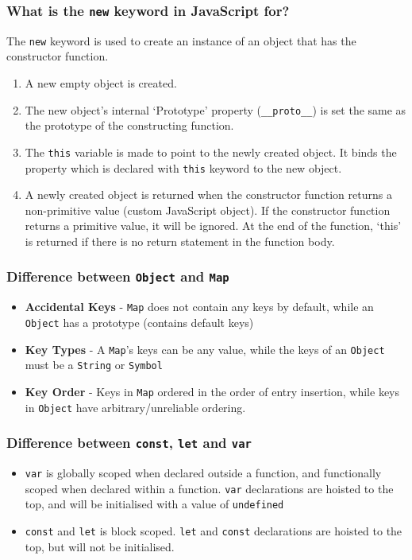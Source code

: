 \documentclass[12pt, a4paper]{article}
\newcommand{\code}[1]{\texttt{#1}}
\begin{document}
\subsubsection*{What is the \code{new} keyword in JavaScript for?}
The \code{new} keyword is used to create an instance of an object that has the constructor function.
\begin{enumerate}
    \item A new empty object is created.
    \item The new object’s internal ‘Prototype’ property (\code{\_\_proto\_\_}) is set the same as the prototype of the constructing function.
    \item The \code{this} variable is made to point to the newly created object. It binds the property which is declared with \code{this} keyword to the new object.
    \item A newly created object is returned when the constructor function returns a non-primitive value (custom JavaScript object).
          If the constructor function returns a primitive value, it will be ignored.
          At the end of the function, ‘this’ is returned if there is no return statement in the function body.    
\end{enumerate}

\subsubsection*{Difference between \code{Object} and \code{Map}}
\begin{itemize}
  \item \textbf{Accidental Keys} - \code{Map} does not contain any keys by default, while an \code{Object} has a prototype (contains default keys)
  \item \textbf{Key Types} - A \code{Map}'s keys can be any value, while the keys of an \code{Object} must be a \code{String} or \code{Symbol}
  \item \textbf{Key Order} - Keys in \code{Map} ordered in the order of entry insertion, while keys in \code{Object} have arbitrary/unreliable ordering. 
\end{itemize}

\subsubsection*{Difference between \code{const}, \code{let} and \code{var}}
\begin{itemize}
  \item \code{var} is globally scoped when declared outside a function, and functionally scoped when declared within a function.\newline
        \code{var} declarations are hoisted to the top, and will be initialised with a value of \code{undefined}
  \item \code{const} and \code{let} is block scoped.\newline
        \code{let} and \code{const} declarations are hoisted to the top, but will not be initialised.
\end{itemize}
\end{document}
